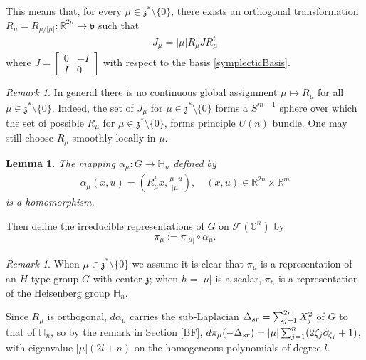 \documentclass[11pt]{amsart}
\theoremstyle{plain}
\newtheorem{lemma}[theorem]{Lemma}
\theoremstyle{definition}
\theoremstyle{remark}
\newtheorem{remark}[theorem]{Remark}
\numberwithin{equation}{section}
\def\fz{\mathfrak{z}}
\def\cF{\mathcal{F}}
\def\mz{\setminus\{0\}}
\def\R{{\mathbb R}}%
\def\C{{\mathbb C}}%
\def \heis {\mathbb{H}}
\numberwithin{equation}{section}
\begin{document}
This means that, for every $\mu\in \mathfrak{z}^*\setminus \{0\}$, there exists an orthogonal transformation $R_\mu=R_{\mu/|\mu|}: \R^{2n}\to \mathfrak{v}$ such that
\begin{align}\label{normalForm}
	J_\mu=|\mu|R_\mu J R_\mu^t
\end{align}
where $J=\begin{bmatrix}
	0& -I \\
	I& 0
\end{bmatrix}$
with respect to the basis \eqref{symplecticBasis}.

\begin{remark}
    In general there is no continuous global assignment $\mu\mapsto R_\mu$  for all $\mu\in \fz^*\mz$. Indeed, the set of $J_\mu$ for $\mu\in \fz^*\mz$ forms a $S^{m-1}$ sphere over which the set of possible $R_\mu$ for $\mu\in \fz^*\mz$, forms  principle $U(n)$ bundle. One may still choose $R_\mu$ smoothly locally in  $\mu$.
\end{remark}
\begin{lemma}
	The mapping $\alpha_\mu: G\to \mathbb{H}_n$ defined by
	\begin{align*}
		\alpha_\mu(x, u)=(R_\mu^t x, \tfrac{\mu\cdot u}{|\mu|}), \quad (x, u)\in \mathbb{R}^{2n}\times\mathbb{R}^m
	\end{align*}
	is a homomorphism.
\end{lemma}

Then define the irreducible representations of $G$ on $\cF(\C^n)$ by 
\begin{align}\label{e:repH}
	\pi_\mu:={\pi}_{|\mu|}\circ\alpha_\mu. 
\end{align}
\begin{remark}
	When $\mu\in \fz^*\mz$ we assume it is clear that $\pi_\mu$ is a representation of an $H$-type group $G$ with center $\fz$; when $h=|\mu|$ is a scalar, $\pi_h$ is a representation of the Heisenberg group $\heis_n$. 
\end{remark}
Since $R_\mu$ is orthogonal, $d\alpha_\mu$ carries the sub-Laplacian $\Delta_{\rm{sr}}=\sum_{j=1}^{2n}X_j^2$ of $G$ to that of $\heis_n$, so by the remark in Section \ref{BF}, $d\pi_\mu(-\Delta_{\rm{sr}})=|\mu|\sum_{j=1}^n(2\zeta_j\partial_{\zeta_j}+1)$, with eigenvalue $|\mu|(2l+n)$ on the homogeneous polynomials of degree $l$.
\end{document}
